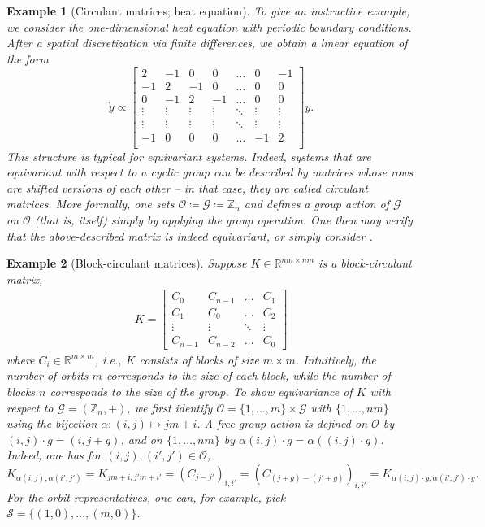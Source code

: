 \documentclass[preprint,12pt,authoryear]{elsarticle}
\newcommand{\Z}{\mathbb Z}
\newcommand{\R}{\mathbb{R}}
\newcommand\Gc{\mathcal G}
\newcommand\Oc{\mathcal O}
\newcommand\Sc{\mathcal S}
\newtheorem{example}{Example}[section]%
\begin{document}
{\begin{example}[Circulant matrices; heat equation]
    To give an instructive example, we consider the one-dimensional heat equation with periodic boundary conditions. After a spatial discretization via finite differences, we obtain a linear equation of the form 
    $$
        \dot y \propto \begin{bmatrix}
            2 & -1 & 0 & 0 & \dots & 0 & -1 \\
            -1 & 2 & -1 & 0 & \dots & 0 & 0 \\
            0 & -1 & 2 & -1 & \dots & 0 & 0 \\
            \vdots & \vdots & \vdots & \vdots & \ddots & \vdots & \vdots \\
            \vdots & \vdots & \vdots & \vdots & \ddots & \vdots & \vdots \\
            -1 & 0 & 0 & 0 & \dots & -1 & 2 \\
        \end{bmatrix} y.
    $$
    This structure is typical for equivariant systems. Indeed, systems that are equivariant with respect to a cyclic group can be described by matrices whose rows are shifted versions of each other -- in that case, they are called \emph{circulant} matrices.
    More formally, one sets $\Oc \coloneqq \Gc \coloneqq \Z_n$ and defines a group action of $\Gc$ on $\Oc$ (that is, itself) simply by applying the group operation. One then may verify that the above-described matrix is indeed equivariant, or simply consider .
\end{example}

\begin{example}[Block-circulant matrices]
    \label{ex:block-circulant}
    Suppose $K \in \R^{nm \times nm}$ is a block-circulant matrix,
    \begin{align*}
        K = \begin{bmatrix}
            C_0 & C_{n-1} & \dots & C_1 \\
            C_1 & C_{0} & \dots & C_2 \\
            \vdots & \vdots & \ddots & \vdots \\
            C_{n-1} & C_{n-2} & \dots & C_0 
        \end{bmatrix}
    \end{align*}
    where $C_i \in \R^{m \times m}$, i.e., $K$ consists of blocks of size $m \times m$. Intuitively, the number of orbits $m$ corresponds to the size of each block, while the number of blocks $n$ corresponds to the size of the group.
    To show equivariance of $K$ with respect to $\Gc = (\Z_n,+)$, we first identify $\Oc =  \{1,\dots,m\} \times \Gc$ with $\{1, \dots, nm\}$ using the bijection $\alpha: (i,j) \mapsto j m + i$. A free group action is defined on $\Oc$ by $(i,j) \cdot g = (i, j + g)$, and on $\{1,\dots,nm\}$ by $\alpha(i,j)\cdot g = \alpha((i,j)\cdot g)$. Indeed, one has for $(i,j),(i',j') \in \Oc$,
    $$
        K_{\alpha(i,j), \alpha(i',j')} 
        = K_{jm+i,j'm+i'}
        = (C_{j-j'})_{i,i'}
        = (C_{(j+g)-(j'+g)})_{i,i'}
        = K_{\alpha(i,j)\cdot g, \alpha(i',j')\cdot g}.
    $$
    For the orbit representatives, one can, for example, pick $\Sc = \{ (1,0), \dots, (m,0) \}$. 
    

\end{example}}
\end{document}
